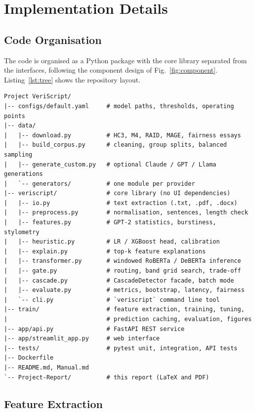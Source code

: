 \section{Implementation Details}

\subsection{Code Organisation}

The code is organised as a Python package with the core library separated from
the interfaces, following the component design of Fig.~\ref{fig:component}.
Listing~\ref{lst:tree} shows the repository layout.

\begin{lstlisting}[language={},numbers=none,caption={Repository structure},label={lst:tree}]
Project VeriScript/
|-- configs/default.yaml     # model paths, thresholds, operating points
|-- data/
|   |-- download.py          # HC3, M4, RAID, MAGE, fairness essays
|   |-- build_corpus.py      # cleaning, group splits, balanced sampling
|   |-- generate_custom.py   # optional Claude / GPT / Llama generations
|   `-- generators/          # one module per provider
|-- veriscript/              # core library (no UI dependencies)
|   |-- io.py                # text extraction (.txt, .pdf, .docx)
|   |-- preprocess.py        # normalisation, sentences, length check
|   |-- features.py          # GPT-2 statistics, burstiness, stylometry
|   |-- heuristic.py         # LR / XGBoost head, calibration
|   |-- explain.py           # top-k feature explanations
|   |-- transformer.py       # windowed RoBERTa / DeBERTa inference
|   |-- gate.py              # routing, band grid search, trade-off
|   |-- cascade.py           # CascadeDetector facade, batch mode
|   |-- evaluate.py          # metrics, bootstrap, latency, fairness
|   `-- cli.py               # `veriscript` command line tool
|-- train/                   # feature extraction, training, tuning,
|                            # prediction caching, evaluation, figures
|-- app/api.py               # FastAPI REST service
|-- app/streamlit_app.py     # web interface
|-- tests/                   # pytest unit, integration, API tests
|-- Dockerfile
|-- README.md, Manual.md
`-- Project-Report/          # this report (LaTeX and PDF)
\end{lstlisting}

\subsection{Feature Extraction}

